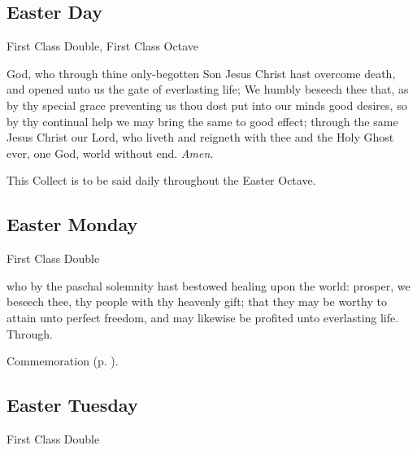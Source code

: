 	\fancyhead[RO,LE]{}
	\fancyhead[RE,LO]{}
	
{}

\subsection{Easter Day}
\begin{inhead}
    {First Class Double, First Class Octave}
\end{inhead}

\collect\label{EasterCollect}
 God, who through thine only-begotten Son Jesus Christ hast overcome death, and opened unto us the gate of everlasting life; We humbly beseech thee that, as by thy special grace preventing us thou dost put into our minds good desires, so by thy continual help we may bring the same to good effect; through the same Jesus Christ our Lord, who liveth and reigneth with thee and the Holy Ghost ever, one God, world without end. \textit{Amen.}
\begin{rubric}
    This Collect is to be said daily throughout the Easter Octave.
\end{rubric}


\subsection{Easter Monday}
\begin{inhead}
    {First Class Double}
\end{inhead}

\collect
{} who by the paschal solemnity hast bestowed healing upon the world: prosper, we beseech thee, thy people with thy heavenly gift; that they may be worthy to attain unto perfect freedom, and may likewise be profited unto everlasting life. Through.
\begin{rubric}
    Commemoration  (p. \pageref{EasterCollect}).
\end{rubric}


\subsection{Easter Tuesday}
\begin{inhead}
    {First Class Double}
\end{inhead}

